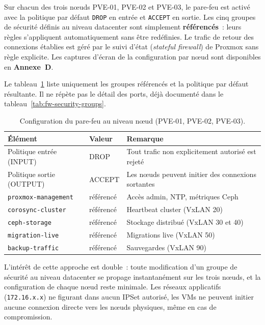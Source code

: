 
\par Sur chacun des trois nœuds PVE-01, PVE-02 et PVE-03, le pare-feu est
activé avec la politique par défaut \texttt{DROP} en entrée et
\texttt{ACCEPT} en sortie. Les cinq groupes de sécurité définis au niveau
datacenter sont simplement \textbf{référencés}~: leurs règles s'appliquent
automatiquement sans être redéfinies. Le trafic de retour des connexions
établies est géré par le suivi d'état (\textit{stateful firewall}) de
Proxmox sans règle explicite. Les captures d'écran de la configuration par
nœud sont disponibles en \textbf{Annexe~D}.\\

\par Le tableau~\ref{tab:fw-node-rules} liste uniquement les groupes
référencés et la politique par défaut résultante. Il ne répète pas le
détail des ports, déjà documenté dans le tableau~\ref{tab:fw-security-groups}.

\begin{table}[H]
\centering
\caption{Configuration du pare-feu au niveau nœud (PVE-01, PVE-02, PVE-03).}
\label{tab:fw-node-rules}
\begin{tabular}{|l|l|l|}
\hline
\textbf{Élément} & \textbf{Valeur} & \textbf{Remarque} \\
\hline
Politique entrée (INPUT) & DROP & Tout trafic non explicitement autorisé est rejeté \\
\hline
Politique sortie (OUTPUT) & ACCEPT & Les nœuds peuvent initier des connexions sortantes \\
\hline
\texttt{proxmox-management} & référencé & Accès admin, NTP, métriques Ceph \\
\hline
\texttt{corosync-cluster}   & référencé & Heartbeat cluster (VxLAN 20) \\
\hline
\texttt{ceph-storage}       & référencé & Stockage distribué (VxLAN 30 et 40) \\
\hline
\texttt{migration-live}     & référencé & Migrations live (VxLAN 50) \\
\hline
\texttt{backup-traffic}     & référencé & Sauvegardes (VxLAN 90) \\
\hline
\end{tabular}
\end{table}

\par L'intérêt de cette approche est double~: toute modification d'un groupe
de sécurité au niveau datacenter se propage instantanément sur les trois
nœuds, et la configuration de chaque nœud reste minimale. Les réseaux
applicatifs (\texttt{172.16.x.x}) ne figurant dans aucun IPSet autorisé,
les VMs ne peuvent initier aucune connexion directe vers les nœuds physiques,
même en cas de compromission.\\

